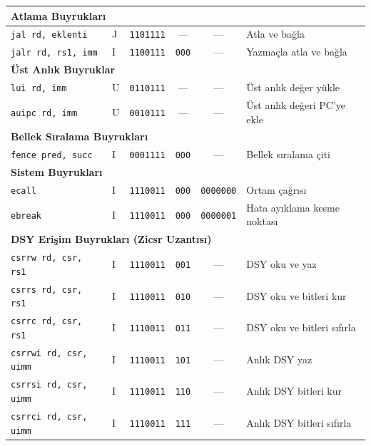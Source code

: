 {\begin{longtable}{@{}l@{\;}l@{\;}c@{\;}c@{\;}c@{\;}l@{}}
\multicolumn{6}{l}{\textbf{Atlama Buyrukları}}\index{atlama buyrukları} \\
\midrule
\texttt{jal rd, eklenti}       & J & \texttt{1101111} & ---          & ---          & Atla ve bağla \\
\texttt{jalr rd, rs1, imm}   & I & \texttt{1100111} & \texttt{000} & ---          & Yazmaçla atla ve bağla \\
\midrule

\multicolumn{6}{l}{\textbf{Üst Anlık Buyruklar}}\index{üst anlık buyruklar} \\
\midrule
\texttt{lui rd, imm}         & U & \texttt{0110111} & ---          & ---          & Üst anlık değer yükle \\
\texttt{auipc rd, imm}       & U & \texttt{0010111} & ---          & ---          & Üst anlık değeri PC'ye ekle \\
\midrule

\multicolumn{6}{l}{\textbf{Bellek Sıralama Buyrukları}}\index{fence}\index{bellek sıralama} \\
\midrule
\texttt{fence pred, succ}      & I & \texttt{0001111} & \texttt{000} & ---          & Bellek sıralama çiti \\
\midrule

\multicolumn{6}{l}{\textbf{Sistem Buyrukları}}\index{sistem buyrukları} \\
\midrule
\texttt{ecall}               & I & \texttt{1110011} & \texttt{000} & \texttt{0000000} & Ortam çağrısı \\
\texttt{ebreak}              & I & \texttt{1110011} & \texttt{000} & \texttt{0000001} & Hata ayıklama kesme noktası \\
\midrule

\multicolumn{6}{l}{\textbf{DSY Erişim Buyrukları (Zicsr Uzantısı)}}\index{Zicsr}\index{CSR buyrukları} \\
\midrule
\texttt{csrrw rd, csr, rs1}  & I & \texttt{1110011} & \texttt{001} & ---          & DSY oku ve yaz \\
\texttt{csrrs rd, csr, rs1}  & I & \texttt{1110011} & \texttt{010} & ---          & DSY oku ve bitleri kur \\
\texttt{csrrc rd, csr, rs1}  & I & \texttt{1110011} & \texttt{011} & ---          & DSY oku ve bitleri sıfırla \\
\texttt{csrrwi rd, csr, uimm} & I & \texttt{1110011} & \texttt{101} & ---         & Anlık DSY yaz \\
\texttt{csrrsi rd, csr, uimm} & I & \texttt{1110011} & \texttt{110} & ---         & Anlık DSY bitleri kur \\
\texttt{csrrci rd, csr, uimm} & I & \texttt{1110011} & \texttt{111} & ---         & Anlık DSY bitleri sıfırla \\
\midrule


\end{longtable}}
